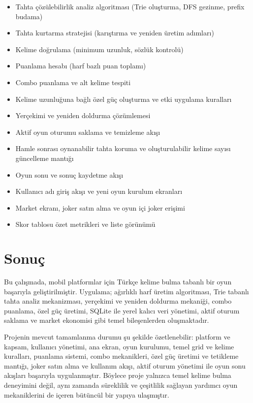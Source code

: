 \documentclass[conference]{IEEEtran}
\begin{document}
\begin{itemize}
  \item Tahta çözülebilirlik analiz algoritması (Trie oluşturma, DFS gezinme, prefix budama)
  \item Tahta kurtarma stratejisi (karıştırma ve yeniden üretim adımları)
  \item Kelime doğrulama (minimum uzunluk, sözlük kontrolü)
  \item Puanlama hesabı (harf bazlı puan toplamı)
  \item Combo puanlama ve alt kelime tespiti
  \item Kelime uzunluğuna bağlı özel güç oluşturma ve etki uygulama kuralları
  \item Yerçekimi ve yeniden doldurma çözümlemesi
  \item Aktif oyun oturumu saklama ve temizleme akışı
  \item Hamle sonrası oynanabilir tahta koruma ve oluşturulabilir kelime sayısı güncelleme mantığı
  \item Oyun sonu ve sonuç kaydetme akışı
  \item Kullanıcı adı giriş akışı ve yeni oyun kurulum ekranları
  \item Market ekranı, joker satın alma ve oyun içi joker erişimi
  \item Skor tablosu özet metrikleri ve liste görünümü
\end{itemize}

\section{Sonuç}

Bu çalışmada, mobil platformlar için Türkçe kelime bulma tabanlı bir oyun başarıyla geliştirilmiştir. Uygulama; ağırlıklı harf üretim algoritması, Trie tabanlı tahta analiz mekanizması, yerçekimi ve yeniden doldurma mekaniği, combo puanlama, özel güç üretimi, SQLite ile yerel kalıcı veri yönetimi, aktif oturum saklama ve market ekonomisi gibi temel bileşenlerden oluşmaktadır.

Projenin mevcut tamamlanma durumu şu şekilde özetlenebilir: platform ve kapsam, kullanıcı yönetimi, ana ekran, oyun kurulumu, temel grid ve kelime kuralları, puanlama sistemi, combo mekanikleri, özel güç üretimi ve tetikleme mantığı, joker satın alma ve kullanım akışı, aktif oturum yönetimi ile oyun sonu akışları başarıyla uygulanmıştır. Böylece proje yalnızca temel kelime bulma deneyimini değil, aynı zamanda süreklilik ve çeşitlilik sağlayan yardımcı oyun mekaniklerini de içeren bütüncül bir yapıya ulaşmıştır.




\end{document}
